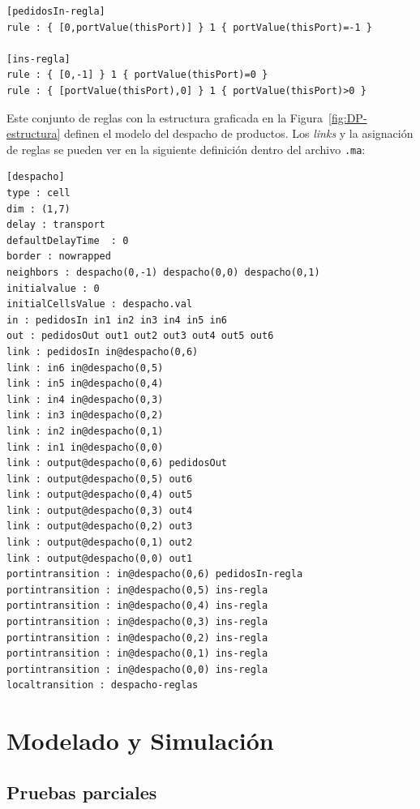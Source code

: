 \documentclass[10pt]{article}
\begin{document}
\begin{minipage}{1\textwidth}
	\centering
	\begin{lstlisting}
[pedidosIn-regla]
rule : { [0,portValue(thisPort)] } 1 { portValue(thisPort)=-1 }

[ins-regla]
rule : { [0,-1] } 1 { portValue(thisPort)=0 }
rule : { [portValue(thisPort),0] } 1 { portValue(thisPort)>0 }
	\end{lstlisting}
\end{minipage}

Este conjunto de reglas con la estructura graficada en la Figura~\ref{fig:DP-estructura} definen el modelo del despacho de productos. Los \textit{links} y la asignación de reglas se pueden ver en la siguiente definición dentro del archivo \texttt{.ma}:

\begin{minipage}{1\textwidth}
	\centering
	\begin{lstlisting}
[despacho]
type : cell
dim : (1,7)
delay : transport
defaultDelayTime  : 0
border : nowrapped
neighbors : despacho(0,-1) despacho(0,0) despacho(0,1)
initialvalue : 0
initialCellsValue : despacho.val
in : pedidosIn in1 in2 in3 in4 in5 in6
out : pedidosOut out1 out2 out3 out4 out5 out6
link : pedidosIn in@despacho(0,6)
link : in6 in@despacho(0,5)
link : in5 in@despacho(0,4)
link : in4 in@despacho(0,3)
link : in3 in@despacho(0,2)
link : in2 in@despacho(0,1)
link : in1 in@despacho(0,0)
link : output@despacho(0,6) pedidosOut
link : output@despacho(0,5) out6
link : output@despacho(0,4) out5
link : output@despacho(0,3) out4
link : output@despacho(0,2) out3
link : output@despacho(0,1) out2
link : output@despacho(0,0) out1
portintransition : in@despacho(0,6) pedidosIn-regla
portintransition : in@despacho(0,5) ins-regla
portintransition : in@despacho(0,4) ins-regla
portintransition : in@despacho(0,3) ins-regla
portintransition : in@despacho(0,2) ins-regla
portintransition : in@despacho(0,1) ins-regla
portintransition : in@despacho(0,0) ins-regla
localtransition : despacho-reglas
\end{lstlisting}
\end{minipage}



\section{Modelado y Simulación}
\subsection{Pruebas parciales}
\end{document}
